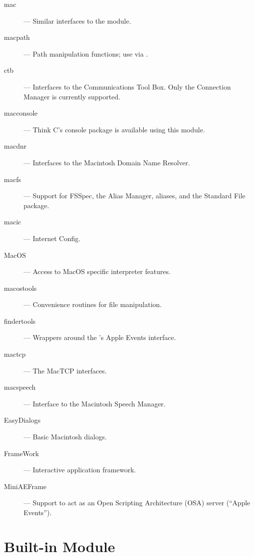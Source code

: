 \begin{description}

\item[mac]
--- Similar interfaces to the  module.

\item[macpath]
--- Path manipulation functions; use via .

\item[ctb]
--- Interfaces to the Communications Tool Box.  Only the Connection
Manager is currently supported.

\item[macconsole]
--- Think C's console package is available using this module.

\item[macdnr]
--- Interfaces to the Macintosh Domain Name Resolver.

\item[macfs]
--- Support for FSSpec, the Alias Manager,  aliases,
and the Standard File package.

\item[macic]
--- Internet Config.

\item[MacOS]
--- Access to MacOS specific interpreter features.

\item[macostools]
--- Convenience routines for file manipulation.

\item[findertools]
--- Wrappers around the 's Apple Events interface.

\item[mactcp]
--- The MacTCP interfaces.

\item[macspeech]
--- Interface to the Macintosh Speech Manager.

\item[EasyDialogs]
--- Basic Macintosh dialogs.

\item[FrameWork]
--- Interactive application framework.

\item[MiniAEFrame]
--- Support to act as an Open Scripting Architecture (OSA) server
(``Apple Events'').

\end{description}


\section{Built-in Module }
\label{module-mac}

